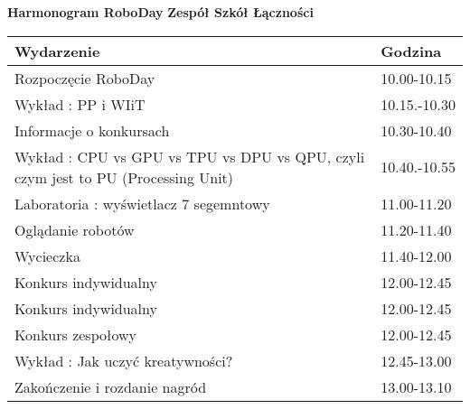 \documentclass{article}
\begin{document}
\begin{center}
\Large\textbf{Harmonogram RoboDay}
\large\textbf{Zespół Szkół Łączności}
\end{center}
\vspace{1cm}
\begin{center}
\begin{tabular}{|l|l|}
\hline
\textbf{Wydarzenie} & \textbf{Godzina} \\
\hline
Rozpoczęcie RoboDay & 10.00-10.15 \\
\hline
Wykład : PP i WIiT & 10.15.-10.30 \\
\hline
Informacje o konkursach & 10.30-10.40 \\
\hline
Wykład : CPU vs GPU vs TPU vs DPU vs QPU, czyli czym jest to PU (Processing Unit) & 10.40.-10.55 \\
\hline
Laboratoria : wyświetlacz 7 segemntowy & 11.00-11.20 \\
\hline
Oglądanie robotów & 11.20-11.40 \\
\hline
Wycieczka & 11.40-12.00 \\
\hline
Konkurs indywidualny & 12.00-12.45 \\
\hline
Konkurs indywidualny & 12.00-12.45 \\
\hline
Konkurs zespołowy & 12.00-12.45 \\
\hline
Wykład : Jak uczyć kreatywności? & 12.45-13.00 \\
\hline
Zakończenie i rozdanie nagród & 13.00-13.10 \\
\hline
\end{tabular}
\end{center}
\end{document}
